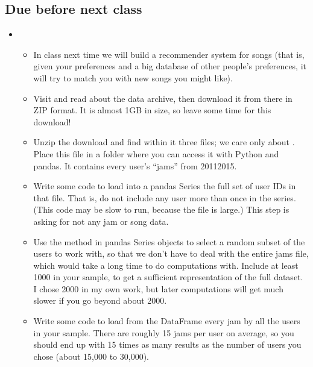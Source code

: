 \documentclass[letterpaper,10pt,english]{sphinxmanual}
\begin{document}
\subsection{Due before next class}
\label{\detokenize{course-schedule:id18}}\begin{itemize}
\item {} 
\begin{itemize}
\item {} 
In class next time we will build a recommender system for songs (that is, given your preferences and a big database of other people’s preferences, it will try to match you with new songs you might like).

\item {} 
Visit  and read about the data archive, then download it from there in ZIP format.  It is almost 1GB in size, so leave some time for this download!

\item {} 
Unzip the download and find within it three files; we care only about .  Place this file in a folder where you can access it with Python and pandas.  It contains every user’s “jams” from 2011\sphinxhyphen{}2015.

\item {} 
Write some code to load into a pandas Series the full set of  user IDs in that file.  That is, do not include any user more than once in the series.  (This code may be slow to run, because the file is large.)  This step is asking for  not any jam or song data.

\item {} 
Use the  method in pandas Series objects to select a random subset of the users to work with, so that we don’t have to deal with the entire jams file, which would take a long time to do computations with.  Include at least 1000 in your sample, to get a sufficient representation of the full dataset.  I chose 2000 in my own work, but later computations will get much slower if you go beyond about 2000.

\item {} 
Write some code to load from the  DataFrame every jam by all the users in your sample.  There are roughly 15 jams per user on average, so you should end up with 15 times as many results as the number of users you chose (about 15,000 to 30,000).


\end{itemize}
\end{itemize}
\end{document}
